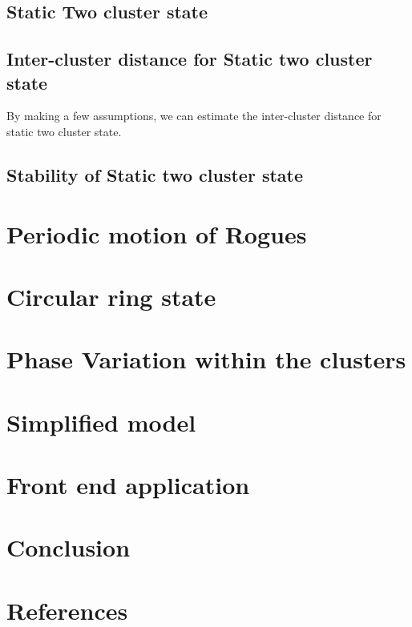 \documentclass[twocolumn,10pt]{asme2ej}
\begin{document}
{    \subsection{Static Two cluster state}
    {
        
    }
    \subsection{Inter-cluster distance for Static two cluster state}
    {
        By making a few assumptions, we can estimate the inter-cluster distance for static two cluster state. 
    }
    \subsection{Stability of Static two cluster state}
    {

    }
}

\section{Periodic motion of Rogues}

\section{Circular ring state}

\section{Phase Variation within the clusters}

\noindent

\section{Simplified model}

\section{Front end application}

\section{Conclusion}


\section{References}
\end{document}

